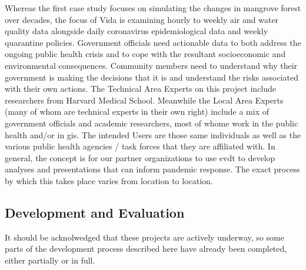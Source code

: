 \documentclass[notitlepage]{article}
\begin{document}
Whereas the first case study focuses on simulating the changes in mangrove forest over decades, the focus of Vida is examining hourly to weekly air and water quality data alongside daily coronavirus epidemiological data and weekly quarantine policies. Government officials need actionable data to both address the ongoing public health crisis and to cope with the resultant socioeconomic and environmental consequences. Community members need to understand why their government is making the decisions that it is and understand the risks associated with their own actions. \color{OliveGreen} The Technical Area Experts on this project include researchers from Harvard Medical School. Meanwhile the Local Area Experts (many of whom are technical experts in their own right) include a mix of government officials and academic researchers, most of whome work in the public health and/or in \ac{gis}. The intended Users are those same individuals as well as the various public health agencies / task forces that they are affiliated with.  In general, \color{black} the concept is for our partner organizations to use \ac{evdt} to develop analyses and presentations that can inform pandemic response. The exact process by which this takes place varies from location to location.

\subsection{Development and Evaluation}


It should be acknolwedged that these projects are actively underway, so some parts of the development process described here have already been completed, either partially or in full.
\end{document}

